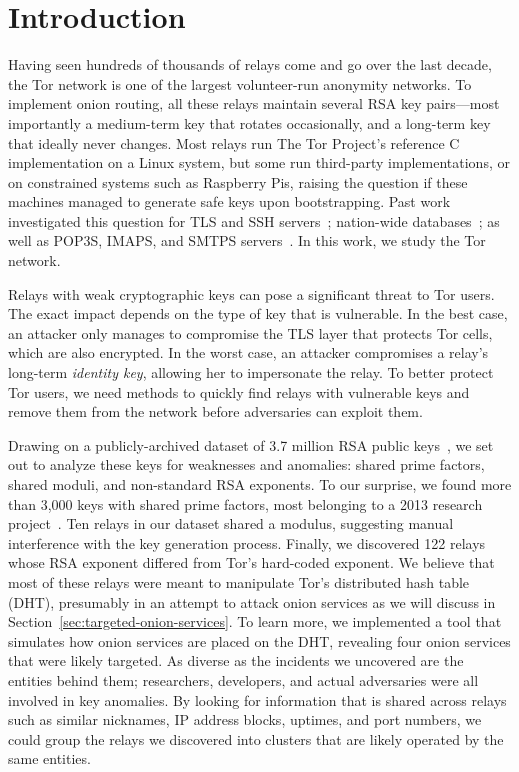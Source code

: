 \section{Introduction}
Having seen hundreds of thousands of relays come and go over the last decade,
the Tor network is one of the largest volunteer-run anonymity networks.  To
implement onion routing, all these relays maintain several RSA key pairs---most
importantly a medium-term key that rotates occasionally, and a long-term key
that ideally never changes.  Most relays run The Tor Project's reference C
implementation on a Linux system, but some run third-party implementations, or
on constrained systems such as Raspberry Pis, raising the question if these
machines managed to generate safe keys upon bootstrapping.  Past work
investigated this question for TLS and SSH servers~\cite{Heninger2012a};
nation-wide databases~\cite{Bernstein2013a}; as well as POP3S, IMAPS, and SMTPS
servers~\cite{Hastings2016a}.  In this work, we study the Tor network.

Relays with weak cryptographic keys can pose a significant threat to Tor users.
The exact impact depends on the type of key that is vulnerable.  In the best
case, an attacker only manages to compromise the TLS layer that protects Tor
cells, which are also encrypted.  In the worst case, an attacker compromises a
relay's long-term \emph{identity key}, allowing her to impersonate the relay.
To better protect Tor users, we need methods to quickly find relays with
vulnerable keys and remove them from the network before adversaries can exploit
them.

Drawing on a publicly-archived dataset of 3.7 million RSA public
keys~\cite{collector}, we set out to analyze these keys for weaknesses and
anomalies: shared prime factors, shared moduli, and non-standard RSA exponents.
To our surprise, we found more than 3,000 keys with shared prime factors, most
belonging to a 2013 research project~\cite{Biryukov2013a}.  Ten relays in
our dataset shared a modulus, suggesting manual interference with the key
generation process.  Finally, we discovered 122 relays whose RSA exponent
differed from Tor's hard-coded exponent.  We believe that most of these relays
were meant to manipulate Tor's distributed hash table (DHT), presumably in an
attempt to attack onion services as we will discuss in
Section~\ref{sec:targeted-onion-services}.  To learn more, we implemented a
tool that simulates how onion services are placed on the DHT, revealing four
onion services that were likely targeted.  As diverse as the incidents we
uncovered are the entities behind them; researchers, developers, and actual
adversaries were all involved in key anomalies.  By looking for information that
is shared across relays such as similar nicknames, IP address blocks, uptimes,
and port numbers, we could group the relays we discovered into clusters that are
likely operated by the same entities.

